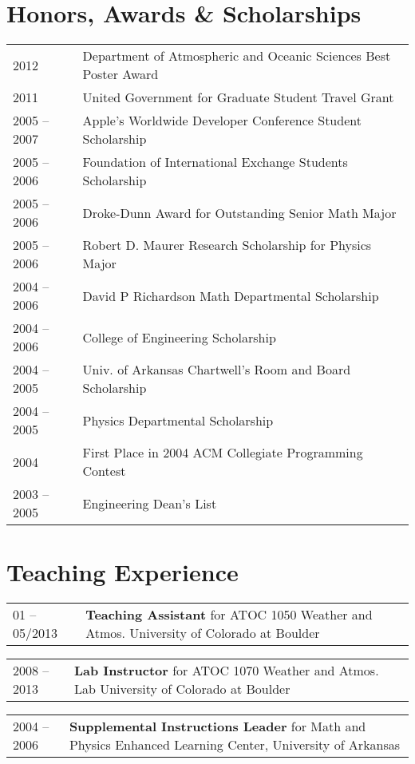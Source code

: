 \documentclass[overlap,12pt,centered]{res}
\makeatletter
\newcommand{\tabulated}{\begin{tabular}{@{}p{1.4in}p{4.9in}}}
\makeatother
\begin{document}
\begin{resume}
		\section{\sc Honors, Awards \& Scholarships}
		\tabulated
			2012		&	{Department of Atmospheric and Oceanic Sciences Best Poster Award} \\
			2011		&	{United Government for Graduate Student Travel Grant} \\
			2005 -- 2007	&	{Apple's Worldwide Developer Conference Student Scholarship} \\
			2005 -- 2006	&	{Foundation of International Exchange Students Scholarship} \\
			2005 -- 2006	&	{Droke-Dunn Award for Outstanding Senior Math Major} \\
			2005 -- 2006	&	{Robert D. Maurer Research Scholarship for Physics Major}  \\
			2004 -- 2006	&	{David P Richardson Math Departmental Scholarship}  \\
			2004 -- 2006	&	{College of Engineering Scholarship} \\
			2004 -- 2005	&	{Univ. of Arkansas Chartwell's Room and Board Scholarship} \\
			2004 -- 2005	&	{Physics Departmental Scholarship} \\
			2004		&	{First Place in 2004 ACM Collegiate Programming Contest} \\
			2003 -- 2005	& 	{Engineering Dean's List}
		\end{tabular}
				
		\section{\sc Teaching Experience}
		\tabulated
			01 -- 05/2013
				&	{\bf Teaching Assistant} for ATOC 1050 Weather and Atmos. \newline
					University of Colorado at Boulder
		\end{tabular}
		
		\tabulated
			2008 -- 2013
				&	{\bf Lab Instructor} for ATOC 1070 Weather and Atmos. Lab  \newline
					University of Colorado at Boulder
		\end{tabular}
		
		\tabulated
			2004 -- 2006
				&	{\bf Supplemental Instructions Leader} for Math and Physics \newline
					Enhanced Learning Center, University of Arkansas
		\end{tabular}
		

\end{resume}
\end{document}
